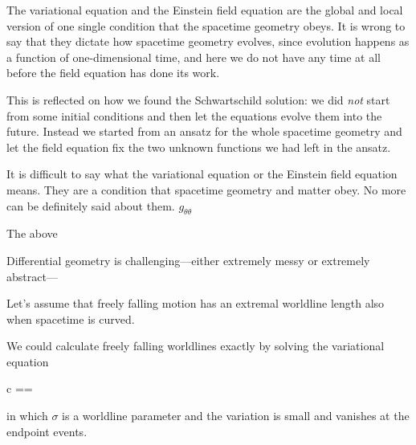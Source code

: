 \documentclass[11pt,oneside%
]{memoir}
\newenvironment{eqna}{\begin{IEEEeqnarray*}{c}}{\end{IEEEeqnarray*}\ignorespacesafterend}
\newcommand{\der}[2]{\frac{\dd#1}{\dd#2}}
\newcommand{\dd}{\mathrm{d}}
\begin{document}

The variational equation and the Einstein field equation are the global and local version of one single condition that the spacetime geometry obeys. It is wrong to say that they dictate how spacetime geometry evolves, since evolution happens as a function of one-dimensional time, and here we do not have any time at all before the field equation has done its work.

This is reflected on how we found the Schwartschild solution: we did \emph{not} start from some initial conditions and then let the equations evolve them into the future. Instead we started from an ansatz for the whole spacetime geometry and let the field equation fix the two unknown functions we had left in the ansatz.

It is difficult to say what the variational equation or the Einstein field equation means. They are a condition that spacetime geometry and matter obey. No more can be definitely said about them.
\(g_{\theta\theta}\)


The above


Differential geometry is challenging---either extremely messy or extremely abstract---







Let's assume that freely falling motion has an extremal worldline length also when spacetime is curved. 

We could calculate freely falling worldlines exactly by solving the variational equation
\begin{eqna}
\delta\tau=\delta\int\dd\tau=\int\delta\,\der{\tau}{\sigma}\,\dd{}
\end{eqna}
in which \(\sigma\) is a worldline parameter and the variation is small and vanishes at the endpoint events.
\end{document}
